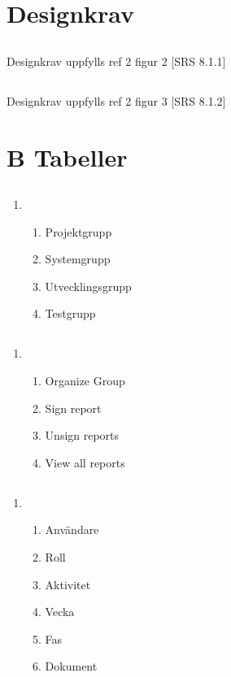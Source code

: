 \documentclass[paper=a4, fontsize=11pt,twoside]{article}
\begin{document}
\section{Designkrav} 

\subsection{} 
Designkrav uppfylls ref 2 figur 2 [SRS 8.1.1]
\subsection{}
Designkrav uppfylls ref 2 figur 3 [SRS 8.1.2]
\section*{B Tabeller}

\subsection{ }
\begin{enumerate}
\item[]
	\begin{enumerate}
	\item Projektgrupp
	\item Systemgrupp
	\item Utvecklingsgrupp
	\item Testgrupp
	\end{enumerate}
\end{enumerate}

\subsection{ }
\begin{enumerate}
\item[]
	\begin{enumerate}
	\item Organize Group
	\item Sign report
	\item Unsign reports
	\item View all reports
	\end{enumerate}
\end{enumerate}

\subsection{ }

\begin{enumerate}
\item[]
	\begin{enumerate}
	\item Användare
	\item Roll
	\item Aktivitet
	\item Vecka
	\item Fas
	\item Dokument
	\end{enumerate}
\end{enumerate}
\end{document}
